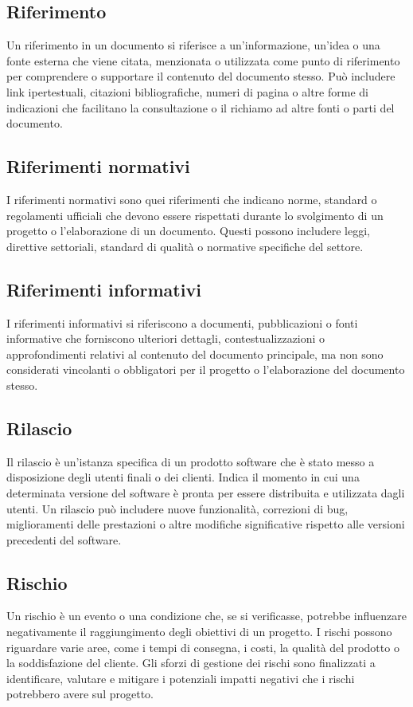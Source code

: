 \subsection{Riferimento} 
Un riferimento in un documento si riferisce a un'informazione, un'idea o una fonte esterna che viene citata, menzionata o utilizzata come punto di riferimento per comprendere o supportare il contenuto del documento stesso. Può includere link ipertestuali, citazioni bibliografiche, numeri di pagina o altre forme di indicazioni che facilitano la consultazione o il richiamo ad altre fonti o parti del documento. 
\subsection{Riferimenti normativi} 
I riferimenti normativi sono quei riferimenti che indicano norme, standard o regolamenti ufficiali che devono essere rispettati durante lo svolgimento di un progetto o l'elaborazione di un documento. Questi possono includere leggi, direttive settoriali, standard di qualità o normative specifiche del settore.
\subsection{Riferimenti informativi} 
I riferimenti informativi si riferiscono a documenti, pubblicazioni o fonti informative che forniscono ulteriori dettagli, contestualizzazioni o approfondimenti relativi al contenuto del documento principale, ma non sono considerati vincolanti o obbligatori per il progetto o l'elaborazione del documento stesso.
\subsection{Rilascio} 
Il rilascio è un'istanza specifica di un prodotto software che è stato messo a disposizione degli utenti finali o dei clienti. Indica il momento in cui una determinata versione del software è pronta per essere distribuita e utilizzata dagli utenti. Un rilascio può includere nuove funzionalità, correzioni di bug, miglioramenti delle prestazioni o altre modifiche significative rispetto alle versioni precedenti del software. 
\subsection{Rischio} 
Un rischio è un evento o una condizione che, se si verificasse, potrebbe influenzare negativamente il raggiungimento degli obiettivi di un progetto. I rischi possono riguardare varie aree, come i tempi di consegna, i costi, la qualità del prodotto o la soddisfazione del cliente. Gli sforzi di gestione dei rischi sono finalizzati a identificare, valutare e mitigare i potenziali impatti negativi che i rischi potrebbero avere sul progetto. 
